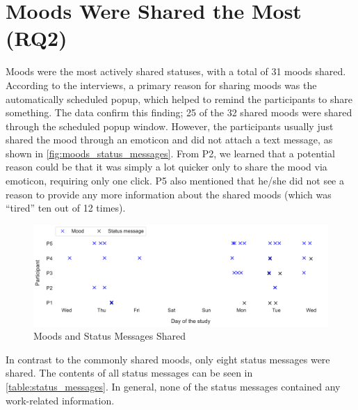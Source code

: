 \section{Moods Were Shared the Most (RQ2)}
\label{section:moods_were_shared_the_most}
Moods were the most actively shared statuses, with a total of 31 moods shared. According to the interviews, a primary reason for sharing moods was the automatically scheduled popup, which helped to remind the participants to share something. The data confirm this finding; 25 of the 32 shared moods were shared through the scheduled popup window. However, the participants usually just shared the mood through an emoticon and did not attach a text message, as shown in \autoref{fig:moods_status_messages}. From P2, we learned that a potential reason could be that it was simply a lot quicker only to share the mood via emoticon, requiring only one click. P5 also mentioned that he/she did not see a reason to provide any more information about the shared moods (which was \enquote{tired} ten out of 12 times).

\begin{figure}[h]
    \centering
    \includegraphics[width=\linewidth]{plots/moods_status_messages.pdf}
    \caption{Moods and Status Messages Shared}
    \label{fig:moods_status_messages}
\end{figure}


In contrast to the commonly shared moods, only eight status messages were shared. The contents of all status messages can be seen in \autoref{table:status_messages}. In general, none of the status messages contained any work-related information.

